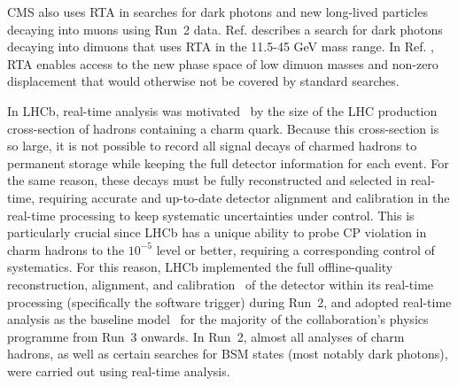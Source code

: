 CMS also uses RTA in searches for dark photons and new long-lived particles decaying into muons using Run~2 data. Ref. \cite{CMS:2019buh} describes a search for dark photons decaying into dimuons that uses RTA in the 11.5-45 GeV mass range. In Ref. \cite{CMS:2021sch}, RTA enables access to the new phase space of low dimuon masses and non-zero displacement that would otherwise not be covered by standard searches.



In LHCb, real-time analysis was motivated~\cite{Gligorov:2018fuk} by the size of the LHC production cross-section of hadrons containing a charm 
quark. Because this cross-section is so large, it is not possible to record all signal decays of charmed hadrons to permanent storage while keeping the full detector information for each event. For the same reason, these decays must be fully reconstructed and selected in real-time, requiring accurate and up-to-date detector alignment and calibration in the real-time processing to keep systematic uncertainties under control. This is particularly crucial since LHCb has a unique ability to probe CP violation in charm hadrons to the $10^{-5}$ level or better, requiring a corresponding control of systematics. For this reason, LHCb implemented the full offline-quality reconstruction, alignment, and calibration~\cite{Dujany:2015lxd, Aaij:2016rxn, Borghi:2017hfp, LHCb:2018zdd, Aaij:2019uij} of the detector within its real-time processing (specifically the software trigger) during Run~2, and adopted real-time analysis as the baseline model~\cite{LHCbCollaboration:2319756} for the majority of the collaboration's physics programme from Run~3 onwards. In Run~2, almost all analyses of charm hadrons, as well as certain searches for BSM states (most notably dark photons), were carried out using real-time analysis.